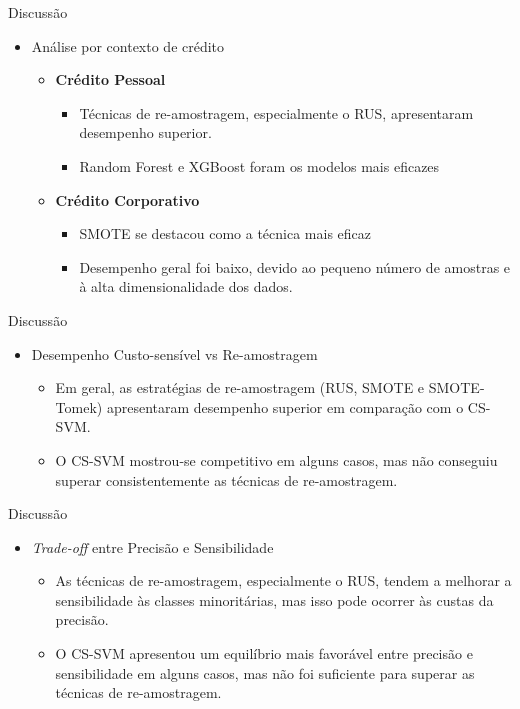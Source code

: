 \begin{frame}{Discussão}
  \begin{itemize}
    \item[$\blacktriangleright$] Análise por contexto de crédito
      \begin{itemize}
        \item \textbf{Crédito Pessoal}
          \begin{itemize}
            \item Técnicas de re-amostragem, especialmente o RUS, apresentaram desempenho superior.
            \item Random Forest e XGBoost foram os modelos mais eficazes
          \end{itemize}
        \item \textbf{Crédito Corporativo}
          \begin{itemize}
            \item SMOTE se destacou como a técnica mais eficaz
            \item Desempenho geral foi baixo, devido ao pequeno número de amostras e à alta dimensionalidade dos dados.
          \end{itemize}
      \end{itemize}
  \end{itemize}
\end{frame}

\begin{frame}{Discussão}
  \begin{itemize}
    \item[$\blacktriangleright$] Desempenho Custo-sensível vs Re-amostragem
      \begin{itemize}
        \item Em geral, as estratégias de re-amostragem (RUS, SMOTE e SMOTE-Tomek) apresentaram desempenho superior em comparação com o CS-SVM.
        \item O CS-SVM mostrou-se competitivo em alguns casos, mas não conseguiu superar consistentemente as técnicas de re-amostragem.
      \end{itemize}
  \end{itemize}
\end{frame}

\begin{frame}{Discussão}
  \begin{itemize}
    \item[$\blacktriangleright$] \textit{Trade-off} entre Precisão e Sensibilidade
      \begin{itemize}
        \item As técnicas de re-amostragem, especialmente o RUS, tendem a melhorar a sensibilidade às classes minoritárias, mas isso pode ocorrer às custas da precisão.
        \item O CS-SVM apresentou um equilíbrio mais favorável entre precisão e sensibilidade em alguns casos, mas não foi suficiente para superar as técnicas de re-amostragem.
      \end{itemize}
  \end{itemize}
\end{frame}
